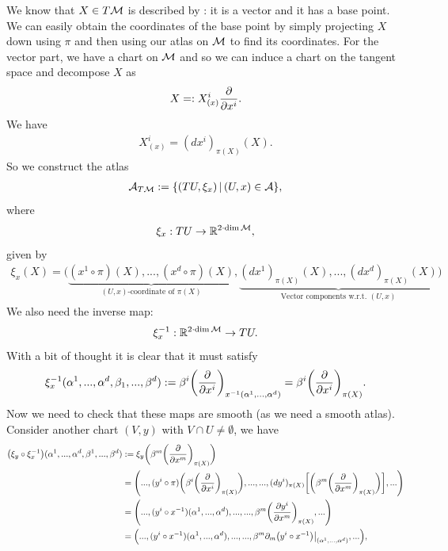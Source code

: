 \documentclass[12pt]{article} %
\begin{document}
We know that $X\in T\mathcal{M}$ is described by : it is a vector and it has a base point. We can easily obtain the coordinates of the base point by simply projecting $X$ down using $\pi$ and then using our atlas on $\mathcal{M}$ to find its coordinates. For the vector part, we have a chart on $\mathcal{M}$ and so we can induce a chart on the tangent space and decompose $X$ as 
\begin{align*}
    X =: X^i_{(x)}\frac{\partial}{\partial x^i}.
\end{align*}
We have
\begin{align*}
    X^i_{(x)} = (dx^i)_{\pi(X)}(X).
\end{align*}
So we construct the atlas
\begin{align*}
    \mathcal{A}_{T\mathcal{M}} := \{ (TU,\xi_x) \, | \, (U,x) \in\mathcal{A}\},
\end{align*}
where
\begin{align*}
    \xi_x : TU \to \mathbb{R}^{2\cdot\dim\mathcal{M}},
\end{align*}
given by
\begin{align*}
    \xi_x(X) = \big( \underbrace{(x^1\circ\pi)(X), ... , (x^d\circ \pi)(X)}_{(U,x)\text{-coordinate of }\pi(X)}, \underbrace{(dx^1)_{\pi(X)}(X), ... , (dx^d)_{\pi(X)}(X)}_{\text{Vector components w.r.t. } (U,x)}\big)
\end{align*}
We also need the inverse map:
\begin{align*}
    \xi_x^{-1} : \mathbb{R}^{2\cdot\dim\mathcal{M}} \to TU.
\end{align*}
With a bit of thought it is clear that it must satisfy 
\begin{align*}
    \xi_x^{-1}(\alpha^1,...,\alpha^d,\beta_1,...,\beta^d) := \beta^i \bigg(\frac{\partial}{\partial x^i}\bigg)_{x^{-1}(\alpha^1,...,\alpha^d)} = \beta^i \bigg(\frac{\partial}{\partial x^i}\bigg)_{\pi(X)}.
\end{align*}
Now we need to check that these maps are smooth (as we need a smooth atlas). Consider another chart $(V,y)$ with $V\cap U\neq\emptyset$, we have
\begin{align*}
    \begin{split}
        \big(\xi_y\circ \xi_x^{-1}\big) (\alpha^1,...,\alpha^d,\beta^1,...,\beta^d) & := \xi_y \bigg( \beta^m \bigg(\frac{\partial}{\partial x^m}\bigg)_{\pi(X)}\bigg) \\
        & = \Bigg(..., (y^i\circ \pi) \bigg(\beta^i \bigg(\frac{\partial}{\partial x^i}\bigg)_{\pi(X)}\bigg),..., ..., (dy^i)_{\pi(X)}\bigg[\bigg(\beta^m \bigg(\frac{\partial}{\partial x^m}\bigg)_{\pi(X)}\bigg)\bigg], ...\Bigg) \\
        & = \Bigg(..., (y^i\circ x^{-1})(\alpha^1,...,\alpha^d), ..., ..., \beta^m \bigg(\frac{\partial y^i}{\partial x^m}\bigg)_{\pi(X)}, ...\Bigg) \\
        & = \Big(..., (y^i\circ x^{-1})(\alpha^1,...,\alpha^d), ..., ..., \beta^m \partial_m \big(y^i\circ x^{-1}\big)\big|_{(\alpha^1,...,\alpha^d)}, ... \Big),
    \end{split}
\end{align*}
\end{document}
